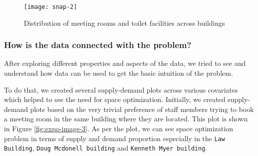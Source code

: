 \begin{figure}[H]
\centering
\texttt{[image: snap-2]}
\caption{Distribution of meeting rooms and toilet facilities across buildings}
\label{fig:expo-image-2}
\end{figure}




\subsubsection{How is the data connected with the problem?}

After exploring different properties and aspects of the data, we tried to see and understand how data can be used to get the basic intuition of the problem.

To do that, we created several supply-demand plots across various covariates which helped to see the need for space optimization. Initially, we created supply-demand plots based on the very trivial preference of staff members trying to book a meeting room in the same building where they are located. This plot is shown in Figure \ref{fig:expo-image-3}. As per the plot, we can see space optimization problem in terms of supply and demand proportion especially in the \texttt{Law Building}, \texttt{Doug Mcdonell building} and \texttt{Kenneth Myer building}.

